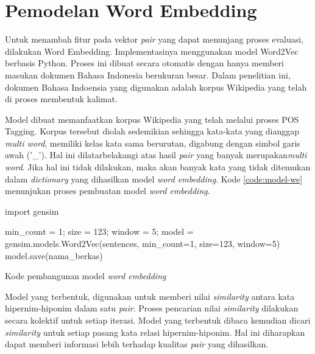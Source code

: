 \section{Pemodelan Word Embedding}
Untuk menambah fitur pada vektor \textit{pair} yang dapat menunjang proses evaluasi, dilakukan Word Embedding. Implementasinya menggunakan model Word2Vec berbasis Python. Proses ini dibuat secara otomatis dengan hanya memberi masukan dokumen Bahasa Indonesia berukuran besar. Dalam penelitian ini, dokumen Bahasa Indoensia yang digunakan adalah korpus Wikipedia yang telah di proses membentuk kalimat.

Model dibuat memanfaatkan korpus Wikipedia yang telah melalui proses POS Tagging. Korpus tersebut diolah sedemikian sehingga kata-kata yang dianggap \textit{multi word}, memiliki kelas kata sama berurutan, digabung dengan simbol garis  awah ('\_'). Hal ini dilatarbelakangi atas hasil \textit{pair} yang banyak merupakan\textit{multi word}. Jika hal ini tidak dilakukan, maka akan banyak kata yang tidak ditemukan dalam \textit{dictionary} yang dihasilkan model \textit{word embedding}. Kode \ref{code:model-we} menunjukan proses pembuatan model \textit{word embedding}.

\begin{kode}

  import gensim\;
  \BlankLine

  min\_count = 1; 
  size = 123;     
  window = 5;     
  model = gensim.models.Word2Vec(sentences, min\_count=1, size=123, window=5)\;
  model.save(nama\_berkas)\;
  
  \caption{Kode pembangunan model \textit{word embedding}}
  \label{code:model-we}
\end{kode}

Model yang terbentuk, digunakan untuk memberi nilai \textit{similarity} antara kata hipernim-hiponim dalam satu \textit{pair}. Proses pencarian nilai \textit{similarity} dilakukan secara kolektif untuk setiap iterasi. Model yang terbentuk dibaca kemudian dicari \textit{similarity} untuk setiap pasang kata relasi hipernim-hiponim. Hal ini diharapkan dapat memberi informasi lebih terhadap kualitas \textit{pair} yang dihasilkan.
